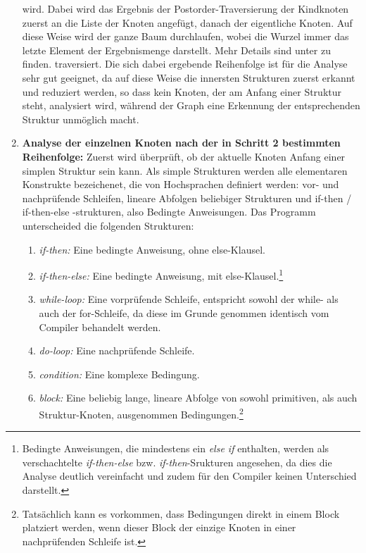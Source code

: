 \documentclass[11pt]{article} %
\begin{document}
\begin{enumerate}
{			wird. Dabei wird das Ergebnis der Postorder-Traversierung der Kindknoten
			zuerst an die Liste der Knoten angefügt, danach der eigentliche Knoten. Auf
			diese Weise wird der ganze Baum durchlaufen, wobei die Wurzel immer das
			letzte Element der Ergebnismenge darstellt. Mehr Details sind unter
			\cite{wiki3:6} zu finden.
		}
		traversiert. Die sich dabei ergebende Reihenfolge ist
		für die Analyse sehr gut geeignet, da auf diese Weise die innersten Strukturen
		zuerst erkannt und reduziert werden, so dass kein Knoten, der am Anfang einer
		Struktur steht, analysiert wird, während der Graph eine Erkennung der entsprechenden
		Struktur unmöglich macht.
	\item{\textbf{Analyse der einzelnen Knoten nach der in Schritt 2 bestimmten Reihenfolge:}}
		Zuerst wird überprüft, ob der aktuelle Knoten Anfang einer simplen
		Struktur sein kann. Als simple Strukturen werden alle elementaren
		Konstrukte bezeichenet, die von Hochsprachen definiert werden: vor-
		und nachprüfende Schleifen, lineare Abfolgen beliebiger Strukturen
		und if-then / if-then-else -strukturen, also Bedingte Anweisungen.
		Das Programm unterscheided die folgenden Strukturen:
		\begin{enumerate}
			\item{\textit{if-then:}}
				Eine bedingte Anweisung, ohne else-Klausel.
			\item{\textit{if-then-else:}}
				Eine bedingte Anweisung, mit else-Klausel.\footnote{
					Bedingte Anweisungen, die mindestens ein \textit{else if}
					enthalten, werden als verschachtelte \textit{if-then-else}
					bzw. \textit{if-then}-Srukturen angesehen, da dies die
					Analyse deutlich vereinfacht und zudem für den Compiler
					keinen Unterschied darstellt.
				}
			\item{\textit{while-loop:}}
				Eine vorprüfende Schleife, entspricht sowohl der
				while- als auch der for-Schleife, da diese im Grunde
				genommen identisch vom Compiler behandelt werden.
			\item{\textit{do-loop:}}
				Eine nachprüfende Schleife.
			\item{\textit{condition:}}
				Eine komplexe Bedingung.
			\item{\textit{block:}}
				Eine beliebig lange, lineare Abfolge von sowohl
				primitiven, als auch Struktur-Knoten, ausgenommen
				Bedingungen.\footnote{
					Tatsächlich kann es vorkommen, dass Bedingungen direkt in
					einem Block platziert werden, wenn dieser Block der einzige
					Knoten in einer nachprüfenden Schleife ist.
}
\end{enumerate}
\end{enumerate}
\end{document}
